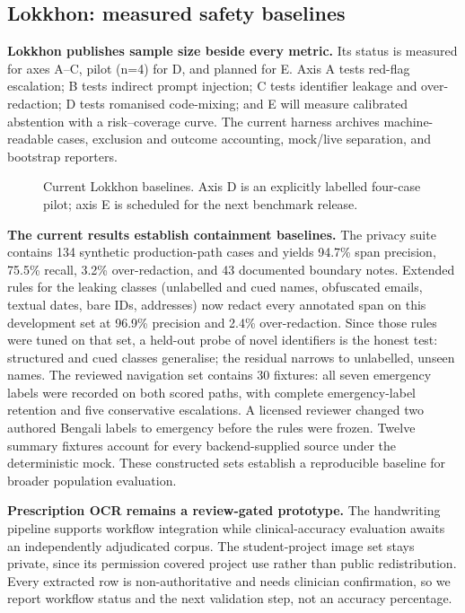 \documentclass[12pt,twocolumn,a4paper]{article}
\begin{document}
\subsection{Lokkhon: measured safety baselines}

\textbf{Lokkhon publishes sample size beside every metric.} Its status is measured for
axes A--C, pilot (n=4) for D, and planned for E. Axis A tests red-flag
escalation; B tests indirect prompt injection; C tests identifier leakage and
over-redaction; D tests romanised code-mixing; and E will measure calibrated abstention with
a risk--coverage curve. The current harness archives machine-readable cases, exclusion and
outcome accounting, mock/live separation, and bootstrap reporters.

\begin{figure}[!t]
\centering
\resizebox{\columnwidth}{!}{}
\caption{Current Lokkhon baselines. Axis D is an explicitly labelled four-case pilot; axis
E is scheduled for the next benchmark release.}
\label{fig:lokkhon}
\end{figure}

\textbf{The current results establish containment baselines.} The
privacy suite contains 134 synthetic production-path cases and yields 94.7\% span precision,
75.5\% recall, 3.2\% over-redaction, and 43 documented boundary notes. Extended rules for the
leaking classes (unlabelled and cued names, obfuscated emails, textual dates, bare IDs,
addresses) now redact every annotated span on this development set at 96.9\% precision and
2.4\% over-redaction. Since those rules were tuned on that set, a held-out probe of novel
identifiers is the honest test: structured and cued classes generalise; the residual narrows
to unlabelled, unseen names. The reviewed navigation
set contains 30 fixtures: all seven emergency labels were recorded on both scored paths,
with complete emergency-label retention and five conservative escalations. A licensed reviewer changed
two authored Bengali labels to emergency before the rules were frozen. Twelve summary
fixtures account for every backend-supplied source under the deterministic mock. These
constructed sets establish a reproducible baseline for broader population evaluation.

\textbf{Prescription OCR remains a review-gated prototype.} The handwriting pipeline supports
workflow integration while clinical-accuracy evaluation awaits an independently adjudicated
corpus. The student-project image set stays private, since its permission covered project use
rather than public redistribution. Every extracted row is non-authoritative and needs
clinician confirmation, so we report workflow status and the next validation step, not an
accuracy percentage.
\end{document}
